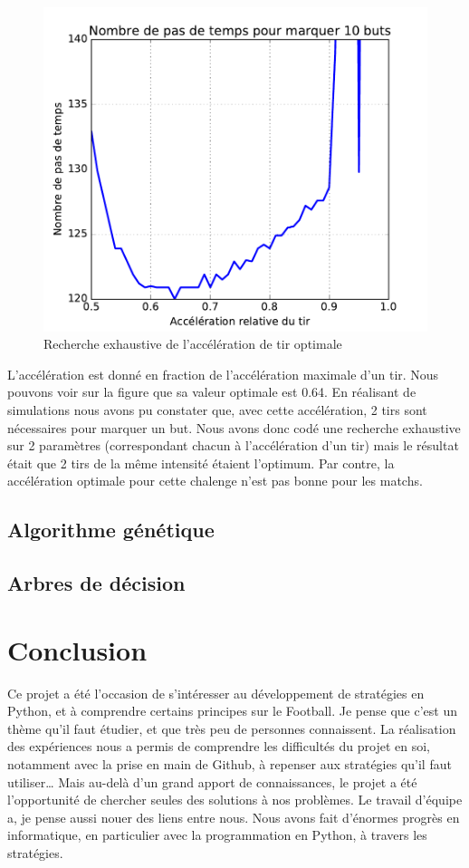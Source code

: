 \documentclass[a4paper,12pt]{article}
\numberwithin{equation}{section}
\begin{document}
\begin{figure}[ht]
\centering
\includegraphics[scale = 0.67]{param_search_chalenge}
\caption{Recherche exhaustive de l'accélération de tir optimale}
\label{Figure2}
\end{figure}

L'accélération est donné en fraction de l'accélération maximale d'un tir. Nous pouvons voir sur la figure que sa valeur optimale est 0.64. En réalisant de simulations nous avons pu constater que, avec cette accélération, 2 tirs sont nécessaires pour marquer un but. Nous avons donc codé une recherche exhaustive sur 2 paramètres (correspondant chacun à l’accélération d'un tir) mais le résultat était que 2 tirs de la même intensité étaient l'optimum. Par contre, la accélération optimale pour cette chalenge n'est pas bonne pour les matchs.


\subsection{Algorithme génétique}

\subsection{Arbres de décision}



\section{Conclusion}

Ce projet a été l’occasion de s’intéresser au développement de stratégies en Python, et à comprendre certains principes sur le Football. Je pense que c’est un thème qu’il faut étudier, et que très peu de personnes connaissent. La réalisation des expériences nous a permis de comprendre les difficultés du projet en soi, notamment avec la prise en main de Github, à repenser aux stratégies qu’il faut utiliser… Mais au-delà d’un grand apport de connaissances, le projet a été l’opportunité de chercher seules des solutions à nos problèmes. Le travail d’équipe a, je pense aussi nouer des liens entre nous. Nous avons fait d’énormes progrès en informatique, en particulier avec la programmation en Python, à travers les stratégies.
\end{document}
